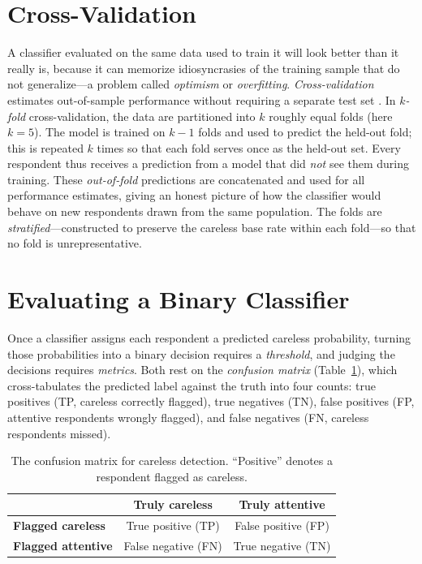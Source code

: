 \section{Cross-Validation}
\label{sec:cv}

A classifier evaluated on the same data used to train it will look better than
it really is, because it can memorize idiosyncrasies of the training sample that
do not generalize---a problem called \emph{optimism} or \emph{overfitting}.
\emph{Cross-validation} estimates out-of-sample performance without requiring a
separate test set \parencite{stone1974cross, kohavi1995study}. In
\emph{$k$-fold} cross-validation, the data are partitioned into $k$ roughly
equal folds (here $k=5$). The model is trained on $k-1$ folds and used to
predict the held-out fold; this is repeated $k$ times so that each fold serves
once as the held-out set. Every respondent thus receives a prediction from a
model that did \emph{not} see them during training. These \emph{out-of-fold}
predictions are concatenated and used for all performance estimates, giving an
honest picture of how the classifier would behave on new respondents drawn from
the same population. The folds are \emph{stratified}---constructed to preserve
the careless base rate within each fold---so that no fold is unrepresentative.

\section{Evaluating a Binary Classifier}
\label{sec:metrics}

Once a classifier assigns each respondent a predicted careless probability,
turning those probabilities into a binary decision requires a \emph{threshold},
and judging the decisions requires \emph{metrics}. Both rest on the
\emph{confusion matrix} (Table~\ref{tab:confusion}), which cross-tabulates the
predicted label against the truth into four counts: true positives (TP, careless
correctly flagged), true negatives (TN), false positives (FP, attentive
respondents wrongly flagged), and false negatives (FN, careless respondents
missed).

\begin{table}[t]
\centering
\caption{The confusion matrix for careless detection. ``Positive'' denotes a
respondent flagged as careless.}
\label{tab:confusion}
\small
\begin{tabular}{l c c}
\toprule
 & \textbf{Truly careless} & \textbf{Truly attentive} \\
\midrule
\textbf{Flagged careless}  & True positive (TP)  & False positive (FP) \\
\textbf{Flagged attentive} & False negative (FN) & True negative (TN)  \\
\bottomrule
\end{tabular}
\end{table}

